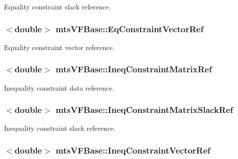 Equality constraint slack reference. 

\hypertarget{classmts_v_f_base_af88966d5b41b80821adb2d69ec8d0fa9}{
\subsubsection[{Eq\-Constraint\-Vector\-Ref}]{$<$double$>$ mts\-V\-F\-Base\-::\-Eq\-Constraint\-Vector\-Ref}}\label{classmts_v_f_base_af88966d5b41b80821adb2d69ec8d0fa9}


Equality constraint vector reference. 

\hypertarget{classmts_v_f_base_a5a7e70da8b7af5531051a347c5cf8a7a}{
\subsubsection[{Ineq\-Constraint\-Matrix\-Ref}]{$<$double$>$ mts\-V\-F\-Base\-::\-Ineq\-Constraint\-Matrix\-Ref}}\label{classmts_v_f_base_a5a7e70da8b7af5531051a347c5cf8a7a}


Inequality constraint data reference. 

\hypertarget{classmts_v_f_base_ae6d2107122aa85ffe1422877d3738e92}{
\subsubsection[{Ineq\-Constraint\-Matrix\-Slack\-Ref}]{$<$double$>$ mts\-V\-F\-Base\-::\-Ineq\-Constraint\-Matrix\-Slack\-Ref}}\label{classmts_v_f_base_ae6d2107122aa85ffe1422877d3738e92}


Inequality constraint slack reference. 

\hypertarget{classmts_v_f_base_a630a27c6fd52487f0981d6c6fa273823}{
\subsubsection[{Ineq\-Constraint\-Vector\-Ref}]{$<$double$>$ mts\-V\-F\-Base\-::\-Ineq\-Constraint\-Vector\-Ref}}\label{classmts_v_f_base_a630a27c6fd52487f0981d6c6fa273823}


